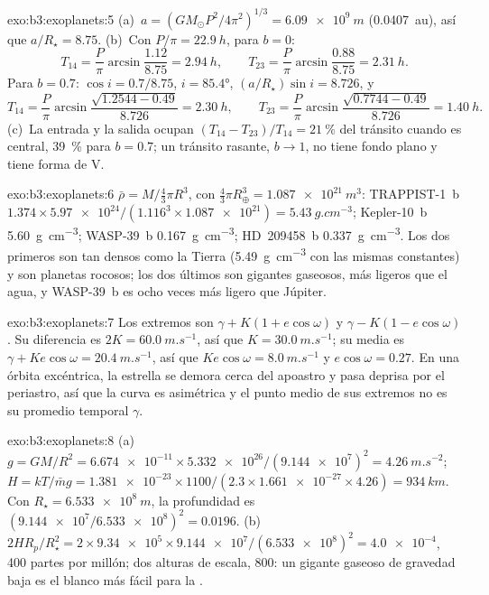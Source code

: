 \begin{solution}{exo:b3:exoplanets:5}
(a)~$a = (GM_\odot P^2/4\pi^2)^{1/3} = \qty{6.09e9}{m}$ (\qty{0.0407}{au}),
así que $a/R_\star = 8.75$. (b)~Con $P/\pi = \qty{22.9}{h}$, para $b = 0$:
\[
T_{14} = \frac P\pi\arcsin\frac{1.12}{8.75} = \qty{2.94}{h}, \qquad
T_{23} = \frac P\pi\arcsin\frac{0.88}{8.75} = \qty{2.31}{h}.
\]
Para $b = 0.7$: $\cos i = 0.7/8.75$, $i = \ang{85.4}$, $(a/R_\star)\sin i =
8.726$, y
\[
T_{14} = \frac P\pi\arcsin\frac{\sqrt{1.2544 - 0.49}}{8.726} = \qty{2.30}{h},
\qquad
T_{23} = \frac P\pi\arcsin\frac{\sqrt{0.7744 - 0.49}}{8.726} = \qty{1.40}{h}.
\]
(c)~La entrada y la salida ocupan $(T_{14} - T_{23})/T_{14} = \qty{21}{\percent}$
del tránsito cuando es central, \qty{39}{\percent} para $b = 0.7$; un
tránsito rasante, $b \to 1$, no tiene fondo plano y tiene forma de V.
\end{solution}

\begin{solution}{exo:b3:exoplanets:6}
$\bar\rho = M/\tfrac43\pi R^3$, con $\tfrac43\pi R_\oplus^3 =
\qty{1.087e21}{m^3}$: TRAPPIST-1~b $1.374\times\num{5.97e24}/(1.116^3\times
\num{1.087e21}) = \qty{5.43}{g.cm^{-3}}$; Kepler-10~b
\qty{5.60}{g.cm^{-3}}; WASP-39~b \qty{0.167}{g.cm^{-3}}; HD~209458~b
\qty{0.337}{g.cm^{-3}}. Los dos primeros son tan densos como la Tierra
(\qty{5.49}{g.cm^{-3}} con las mismas constantes) y son planetas rocosos; los dos últimos
son gigantes gaseosos, más ligeros que el agua, y WASP-39~b es ocho veces más ligero que
Júpiter.
\end{solution}

\begin{solution}{exo:b3:exoplanets:7}
Los extremos son $\gamma + K(1 + e\cos\omega)$ y $\gamma - K(1 -
e\cos\omega)$. Su diferencia es $2K = \qty{60.0}{m.s^{-1}}$, así que $K =
\qty{30.0}{m.s^{-1}}$; su media es $\gamma + Ke\cos\omega =
\qty{20.4}{m.s^{-1}}$, así que $Ke\cos\omega = \qty{8.0}{m.s^{-1}}$ y
$e\cos\omega = 0.27$. En una órbita excéntrica, la estrella se demora cerca
del apoastro y pasa deprisa por el periastro, así que la curva es asimétrica y el
punto medio de sus extremos no es su promedio temporal $\gamma$.
\end{solution}

\begin{solution}{exo:b3:exoplanets:8}
(a)~$g = GM/R^2 = \num{6.674e-11}\times\num{5.332e26}/(\num{9.144e7})^2 =
\qty{4.26}{m.s^{-2}}$; $H = kT/\bar m g = \num{1.381e-23}\times1100/(2.3
\times\num{1.661e-27}\times4.26) = \qty{934}{km}$. Con $R_\star =
\qty{6.533e8}{m}$, la profundidad es $(\num{9.144e7}/\num{6.533e8})^2 =
\num{0.0196}$. (b)~$2HR_p/R_\star^2 = 2\times\num{9.34e5}\times
\num{9.144e7}/(\num{6.533e8})^2 = \num{4.0e-4}$, 400 partes por millón;
dos alturas de escala, 800: un gigante gaseoso de gravedad baja es el blanco más fácil
para la .
\end{solution}

